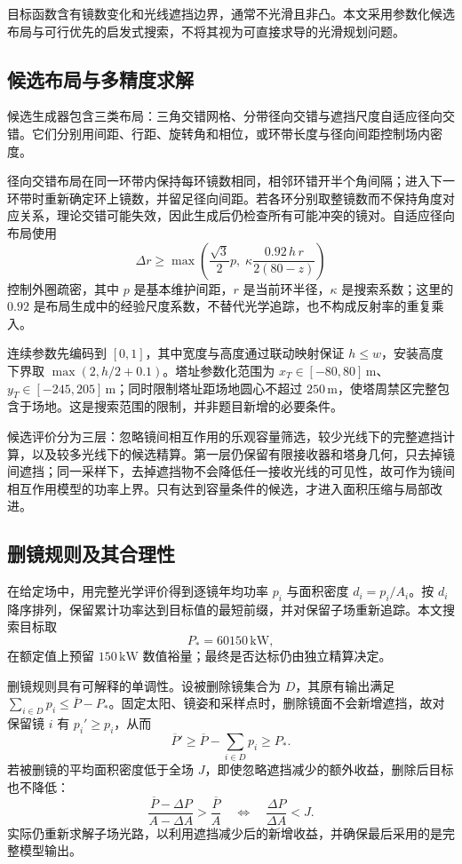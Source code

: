\documentclass[UTF8,a4paper,zihao=-4,fontset=mac]{ctexart}
\newcommand{\mean}[1]{\overline{#1}}
\begin{document}
目标函数含有镜数变化和光线遮挡边界，通常不光滑且非凸。本文采用参数化候选布局与可行优先的启发式搜索，不将其视为可直接求导的光滑规划问题。

\subsection{候选布局与多精度求解}
候选生成器包含三类布局：三角交错网格、分带径向交错与遮挡尺度自适应径向交错。它们分别用间距、行距、旋转角和相位，或环带长度与径向间距控制场内密度。

径向交错布局在同一环带内保持每环镜数相同，相邻环错开半个角间隔；进入下一环带时重新确定环上镜数，并留足径向间距。若各环分别取整镜数而不保持角度对应关系，理论交错可能失效，因此生成后仍检查所有可能冲突的镜对。自适应径向布局使用
\begin{equation}
\Delta r\ge\max\!\left(\frac{\sqrt3}{2}p,\;
\kappa\frac{0.92\,h\,r}{2(80-z)}\right)
\end{equation}
控制外圈疏密，其中 $p$ 是基本维护间距，$r$ 是当前环半径，$\kappa$ 是搜索系数；这里的 $0.92$ 是布局生成中的经验尺度系数，不替代光学追踪，也不构成反射率的重复乘入。

连续参数先编码到 $[0,1]$，其中宽度与高度通过联动映射保证 $h\le w$，安装高度下界取 $\max(2,h/2+0.1)$。塔址参数化范围为 $x_T\in[-80,80]\,\mathrm m$、$y_T\in[-245,205]\,\mathrm m$；同时限制塔址距场地圆心不超过 $250\,\mathrm m$，使塔周禁区完整包含于场地。这是搜索范围的限制，并非题目新增的必要条件。

候选评价分为三层：忽略镜间相互作用的乐观容量筛选，较少光线下的完整遮挡计算，以及较多光线下的候选精算。第一层仍保留有限接收器和塔身几何，只去掉镜间遮挡；同一采样下，去掉遮挡物不会降低任一接收光线的可见性，故可作为镜间相互作用模型的功率上界。只有达到容量条件的候选，才进入面积压缩与局部改进。

\subsection{删镜规则及其合理性}
在给定场中，用完整光学评价得到逐镜年均功率 $p_i$ 与面积密度 $d_i=p_i/A_i$。按 $d_i$ 降序排列，保留累计功率达到目标值的最短前缀，并对保留子场重新追踪。本文搜索目标取
\begin{equation}
P_*=60150\,\mathrm{kW},
\end{equation}
在额定值上预留 $150\,\mathrm{kW}$ 数值裕量；最终是否达标仍由独立精算决定。

删镜规则具有可解释的单调性。设被删除镜集合为 $D$，其原有输出满足 $\sum_{i\in D}p_i\le\mean P-P_*$。固定太阳、镜姿和采样点时，删除镜面不会新增遮挡，故对保留镜 $i$ 有 $p_i'\ge p_i$，从而
\begin{equation}
\mean P'\ge\mean P-\sum_{i\in D}p_i\ge P_*.
\end{equation}
若被删镜的平均面积密度低于全场 $J$，即使忽略遮挡减少的额外收益，删除后目标也不降低：
\begin{equation}
\frac{\mean P-\Delta P}{A-\Delta A}>\frac{\mean P}{A}
\quad\Longleftrightarrow\quad \frac{\Delta P}{\Delta A}<J.
\label{eq:trim}
\end{equation}
实际仍重新求解子场光路，以利用遮挡减少后的新增收益，并确保最后采用的是完整模型输出。
\end{document}
